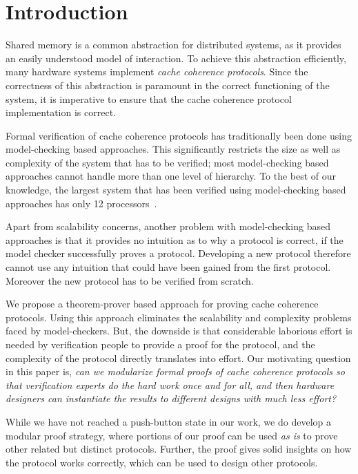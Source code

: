 \section{Introduction}
\label{sec:Introduction}

Shared memory is a common abstraction for distributed systems, as it provides
an easily understood model of interaction. To achieve this abstraction
efficiently, many hardware systems implement \emph{cache coherence protocols}.
Since the correctness of this abstraction is paramount in the correct
functioning of the system, it is imperative to ensure that the cache coherence
protocol implementation is correct.

Formal verification of cache coherence protocols has traditionally been done
using model-checking based approaches. This significantly restricts the size as
well as complexity of the system that has to be verified; most model-checking
based approaches cannot handle more than one level of hierarchy. To the best of
our knowledge, the largest system that has been verified using model-checking
based approaches has only 12 processors~\cite{Chen:2008:VHC:1559300}.

Apart from scalability concerns, another problem with model-checking based
approaches is that it provides no intuition as to why a protocol is correct, if
the model checker successfully proves a protocol. Developing a new protocol
therefore cannot use any intuition that could have been gained from the first
protocol. Moreover the new protocol has to be verified from scratch.

We propose a theorem-prover based approach for proving cache coherence
protocols. Using this approach eliminates the scalability and complexity
problems faced by model-checkers. But, the downside is that considerable
laborious effort is needed by verification people to provide a proof for the
protocol, and the complexity of the protocol directly translates into effort.
Our motivating question in this paper is,
\emph{can we modularize formal proofs of cache coherence protocols so that
verification experts do the hard work once and for all, and then hardware
designers can instantiate the results to different designs with much less
effort?}

While we have not reached a push-button state in our work, we do
develop a modular proof strategy, where portions of our proof can be
used \emph{as is} to prove other related but distinct
protocols. Further, the proof gives solid insights on how the protocol
works correctly, which can be used to design other protocols.

